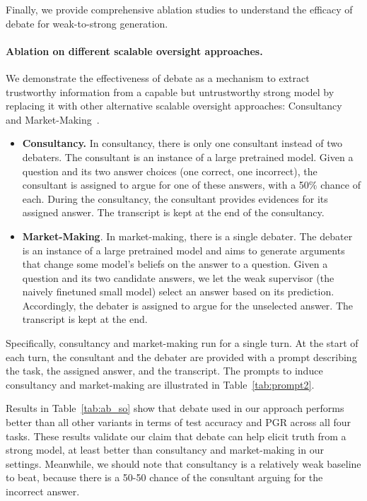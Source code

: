 \documentclass[letterpaper]{article} %
\begin{document}
Finally, we provide comprehensive ablation studies to understand the efficacy of debate for weak-to-strong generation.

\paragraph{Ablation on different scalable oversight approaches.} We demonstrate the effectiveness of debate as a mechanism to extract trustworthy information from a capable but untrustworthy strong model by replacing it with other alternative scalable oversight approaches: Consultancy~\cite{michael2023debate} and Market-Making~\cite{Hubinger2020market}.
\begin{itemize}
    \item \textbf{Consultancy.} In consultancy, there is only one consultant instead of two debaters. The consultant is an instance of a large pretrained model. Given a question and its two answer choices (one correct, one incorrect), the consultant is assigned to argue for one of these answers, with a 50\% chance of each. During the consultancy, the consultant provides evidences for its assigned answer. The transcript is kept at the end of the consultancy.
    \item \textbf{Market-Making}. In market-making, there is a single debater. The debater is an instance of a large pretrained model and aims to generate arguments that change some model's beliefs on the answer to a question. Given a question and its two candidate answers, we let the weak supervisor (the naively finetuned small model) select an answer based on its prediction. Accordingly, the debater is assigned to argue for the unselected answer. The transcript is kept at the end.
\end{itemize}

Specifically, consultancy and market-making run for a single turn. At the start of each turn, the consultant and the debater are provided with a prompt describing the task, the assigned answer, and the transcript.
The prompts to induce consultancy and market-making are illustrated in Table~\ref{tab:prompt2}.

Results in Table~\ref{tab:ab_so} show that debate used in our approach performs better than all other variants in terms of test accuracy and PGR across all four tasks.
These results validate our claim that debate can help elicit truth from a strong model, at least better than consultancy and market-making in our settings.
Meanwhile, we should note that consultancy is a relatively weak baseline to beat, because there is a 50-50 chance of the consultant arguing for the incorrect answer.
\end{document}
